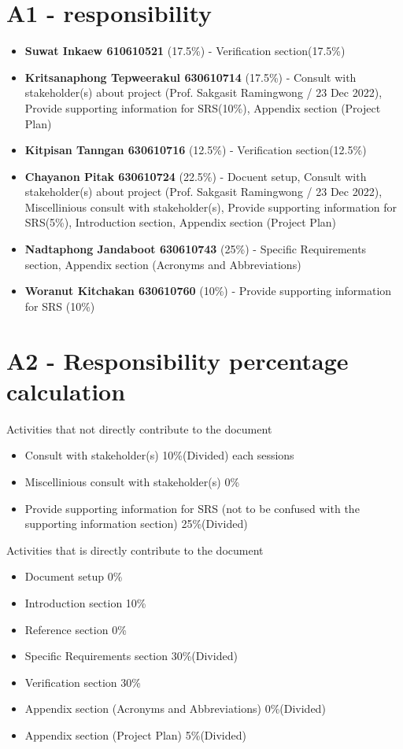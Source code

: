 \documentclass[ 10pt]{report}
\begin{document}
        \section{A1 - responsibility}
        \begin{itemize}
            \item \textbf{Suwat Inkaew 610610521} (17.5\%) - Verification section(17.5\%)
            \item \textbf{Kritsanaphong Tepweerakul 630610714} (17.5\%) - Consult with stakeholder(s) about project (Prof. Sakgasit Ramingwong / 23 Dec 2022), Provide supporting information for SRS(10\%), Appendix section (Project Plan)
            \item \textbf{Kitpisan Tanngan 630610716} (12.5\%) - Verification section(12.5\%)
            \item \textbf{Chayanon Pitak 630610724} (22.5\%) - Docuent setup, Consult with stakeholder(s) about project (Prof. Sakgasit Ramingwong / 23 Dec 2022), Miscellinious consult with stakeholder(s), Provide supporting information for SRS(5\%), Introduction section, Appendix section (Project Plan)
            \item \textbf{Nadtaphong Jandaboot 630610743} (25\%) - Specific Requirements section, Appendix section (Acronyms and Abbreviations)
            \item \textbf{Woranut Kitchakan 630610760} (10\%) - Provide supporting information for SRS (10\%)
        \end{itemize}

        \section{A2 - Responsibility percentage calculation}

        Activities that not directly contribute to the document
        \begin{itemize}
            \item Consult with stakeholder(s) 10\%(Divided) each sessions
            \item Miscellinious consult with stakeholder(s) 0\%
            \item Provide supporting information for SRS (not to be confused with the supporting information section) 25\%(Divided)
        \end{itemize}
        \indent\indent Activities that is directly contribute to the document
        \begin{itemize}
            \item Document setup 0\%
            \item Introduction section 10\%
            \item Reference section 0\%
            \item Specific Requirements section 30\%(Divided)
            \item Verification section 30\%
            \item Appendix section (Acronyms and Abbreviations) 0\%(Divided)
            \item Appendix section (Project Plan) 5\%(Divided)
        \end{itemize}
\end{document}
